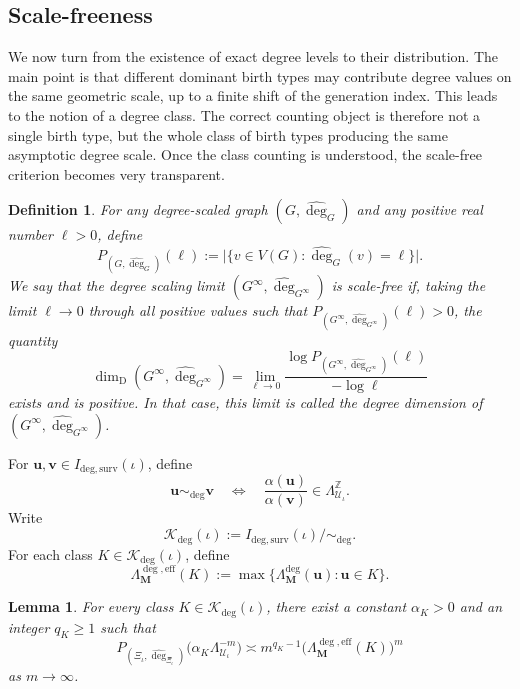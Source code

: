 \documentclass[12pt]{iopart}
\newtheorem{lemma}[theorem]{Lemma}
\newtheorem{definition}[theorem]{Definition}
\newcommand*{\dimdeg}{\dim_\mathrm{D}}
\begin{document}
\subsection{Scale-freeness}

We now turn from the existence of exact degree levels to their distribution.
The main point is that different dominant birth types may contribute degree values on the same geometric scale, up to a finite shift of the generation index.
This leads to the notion of a degree class.
The correct counting object is therefore not a single birth type, but the whole class of birth types producing the same asymptotic degree scale.
Once the class counting is understood, the scale-free criterion becomes very transparent.

\begin{definition}\label{def:degree-dimension}
For any degree-scaled graph $(G,\hat\deg_G)$ and any positive real number $\ell>0$, define
\[
P_{(G,\hat\deg_G)}(\ell)
:=
\big|\{v\in V(G):\hat{\deg}_G(v)=\ell\}\big|.
\]
We say that the degree scaling limit $(G^\infty,\hat\deg_{G^\infty})$ is \emph{scale-free} if, taking the limit $\ell\to 0$ through all positive values such that
$P_{(G^\infty,\hat\deg_{G^\infty})}(\ell)>0$, the quantity
\[
\dimdeg(G^\infty,\hat\deg_{G^\infty})
=
\lim_{\ell\to 0}
\frac{
\log P_{(G^\infty,\hat\deg_{G^\infty})}(\ell)
}{
-\log \ell
}
\]
exists and is positive.
In that case, this limit is called the \emph{degree dimension} of $(G^\infty,\hat\deg_{G^\infty})$.
\end{definition}

For $\mathbf u,\mathbf v\in I_{\mathrm{deg,surv}}(\iota)$, define
\[
\mathbf u\sim_{\deg}\mathbf v
\quad\Longleftrightarrow\quad
\frac{\alpha(\mathbf u)}{\alpha(\mathbf v)}
\in
\Lambda_{\mathcal U_\iota}^{\mathbb Z}.
\]
Write
\[
\mathscr K_{\deg}(\iota)
:=
I_{\mathrm{deg,surv}}(\iota)/\sim_{\deg}.
\]
For each class $K\in\mathscr K_{\deg}(\iota)$, define
\[
\Lambda_{\mathbf M}^{\deg,\mathrm{eff}}(K)
:=
\max\big\{
\Lambda_{\mathbf M}^{\deg}(\mathbf u):
\mathbf u\in K
\big\}.
\]

\begin{lemma}\label{lem:class-count}
For every class $K\in\mathscr K_{\deg}(\iota)$, there exist a constant $\alpha_K>0$ and an integer $q_K\ge 1$ such that
\[
P_{(\Xi_\iota,\hat{\deg}_{\Xi_\iota})}
\big(\alpha_K\Lambda_{\mathcal U_\iota}^{-m}\big)
\asymp
m^{q_K-1}
\big(\Lambda_{\mathbf M}^{\deg,\mathrm{eff}}(K)\big)^m
\]
as $m\to\infty$.
\end{lemma}
\end{document}
